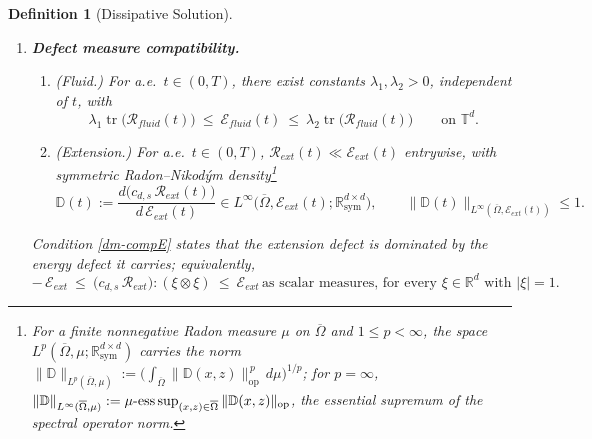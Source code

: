 \documentclass[12pt,a4paper,twoside]{article}
\newcommand{\Ov}[1]{\overline{#1}}
\newcommand{\vr}{\varrho}
\newcommand{\vc}[1]{{\bf #1}}
\newcommand{\Grad}{\nabla}
\newtheorem{df}{Definition}
\numberwithin{equation}{section}%
\newcommand{\Om}{\Omega}
\newcommand{\vm}{\vc{m}}
\begin{document}
\begin{df}[Dissipative Solution]
\begin{enumerate}[leftmargin=*]
\begin{equation}
\begin{aligned}
					+\int_{\mathbb T^d}d\mathcal E_{fluid}(\tau)+\iint_{\overline\Omega}d\mathcal E_{ext}(\tau)\\
					&\le \int_{\mathbb T^d}\Big(\tfrac12\tfrac{|\vm_0|^2}{\vr_0}+P(\vr_0)\Big)\,dx
					+\tfrac{c_{d,s}}2\iint_\Omega z^{1-2s}|\Grad_{x,z}U_0|^2\,dx\,dz .
				\end{aligned}
			\end{equation}
		\item \textbf{Defect measure compatibility.} 
		\begin{enumerate}
			\item[\rm(a)] \emph{(Fluid.)} For a.e.\ $t\in(0,T)$, there exist constants $\lambda_1,\lambda_2>0$, independent of $t$, with
			\begin{equation}\label{dm-compf}
				\lambda_1 \operatorname{tr}\big(\mathcal R_{fluid}(t)\big) \ \le\ \mathcal E_{fluid}(t) \ \le\ \lambda_2 \operatorname{tr}\big(\mathcal R_{fluid}(t)\big)
				\qquad\text{on } \mathbb{T}^d .
			\end{equation}
		\item[\rm(b)] \emph{(Extension.)} For a.e.\ $t\in(0,T)$, $\mathcal R_{ext}(t)\ll\mathcal E_{ext}(t)$ entrywise, with symmetric
		Radon--Nikod\'ym density\footnote{For a finite nonnegative Radon measure $\mu$ on $\overline\Omega$ and $1\le p<\infty$, the space
				$L^p(\overline\Omega,\mu;\mathbb R^{d\times d}_{\mathrm{sym}})$ carries the norm
				$\|\mathbb D\|_{L^p(\overline\Omega,\mu)}:=\Big(\int_{\overline\Omega}\|\mathbb D(x,z)\|_{\mathrm{op}}^{\,p}\,d\mu\Big)^{1/p}$;
				for $p=\infty$,
				$\|\mathbb D\|_{L^\infty(\overline\Omega,\mu)}:=\mu\text{-}\hspace{-0.15em}\operatorname*{ess\,sup}_{(x,z)\in\overline\Omega}\|\mathbb D(x,z)\|_{\mathrm{op}}$,
				the essential supremum of the spectral operator norm.}
		\begin{equation}\label{dm-compE}
		\mathbb D(t):=\frac{d\big(c_{d,s}\,\mathcal R_{ext}(t)\big)}{d\,\mathcal E_{ext}(t)}
		\in L^\infty\big(\overline\Omega,\mathcal E_{ext}(t);\mathbb R^{d\times d}_{\mathrm{sym}}\big),
		\qquad \|\mathbb D(t)\|_{L^\infty( \Ov{\Om},\mathcal E_{ext}(t))}\le 1 .
		\end{equation}
	\end{enumerate}
		Condition \eqref{dm-compE} states that the extension defect is dominated by the energy defect it carries; equivalently,
		\begin{equation}\label{defm-do}
		-\,\mathcal E_{ext} \ \le\ \big(c_{d,s}\,\mathcal R_{ext}\big):(\xi\otimes\xi) \ \le\ \mathcal E_{ext}
		\, \text{as scalar measures, for every } \xi\in\mathbb R^d \text{ with } |\xi|=1 .
		\end{equation}
		\end{enumerate}

	\end{df}
	
\end{document}

